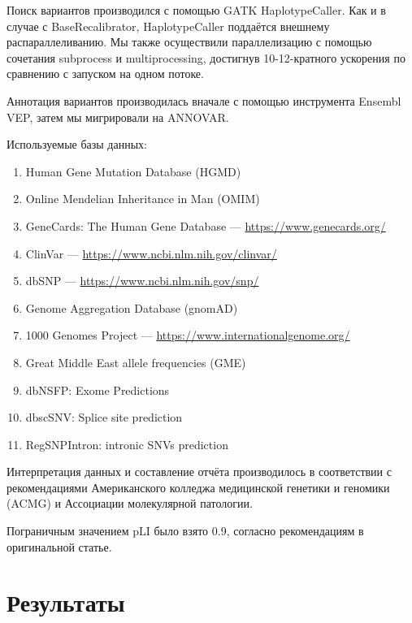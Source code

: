 \documentclass[a4paper,12pt]{article}
\begin{document}
Поиск вариантов производился с помощью GATK HaplotypeCaller.
Как и в случае с BaseRecalibrator, HaplotypeCaller поддаётся внешнему распараллеливанию\cite{heldenbrand}.
Мы также осуществили параллелизацию с помощью сочетания subprocess и multiprocessing, достигнув 10-12-кратного ускорения по сравнению с запуском на одном потоке.

Аннотация вариантов производилась вначале с помощью инструмента Ensembl VEP\cite{vep}, затем мы мигрировали на ANNOVAR\cite{annovar}.

Используемые базы данных:

\begin{enumerate}
\item Human Gene Mutation Database (HGMD\textregistered)\cite{hgmd}
\item Online Mendelian Inheritance in Man (OMIM\textregistered)\cite{omim}
\item GeneCards\textregistered: The Human Gene Database --- \href{https://www.genecards.org/}{https://www.genecards.org/}
\item ClinVar --- \href{https://www.ncbi.nlm.nih.gov/clinvar/}{https://www.ncbi.nlm.nih.gov/clinvar/}
\item dbSNP --- \href{https://www.ncbi.nlm.nih.gov/snp/}{https://www.ncbi.nlm.nih.gov/snp/}
\item Genome Aggregation Database (gnomAD)\cite{gnomad}
\item 1000 Genomes Project --- \href{https://www.internationalgenome.org/}{https://www.internationalgenome.org/}
\item Great Middle East allele frequencies (GME)\cite{gme}
\item dbNSFP: Exome Predictions\cite{dbnsfp}
\item dbscSNV: Splice site prediction\cite{dbscsnv}
\item RegSNPIntron: intronic SNVs prediction\cite{regsnpintron}
\end{enumerate}

Интерпретация данных и составление отчёта производилось в соответствии с рекомендациями Американского колледжа медицинской генетики и геномики (ACMG) и Ассоциации молекулярной патологии\cite{richards}.

Пограничным значением pLI было взято 0.9, согласно рекомендациям в оригинальной статье\cite{lek}.

\section{Результаты}
\end{document}
